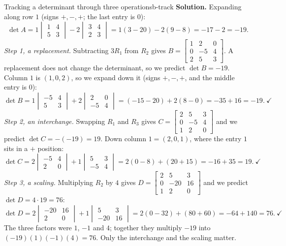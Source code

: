 \documentclass[11pt]{article}
\begin{document}
\begin{exmp}{Tracking a determinant through three operations}{b-track}
\textbf{Solution.} Expanding along row $1$ (signs $+,-,+$; the last entry is $0$):
\[
\det A=1\begin{vmatrix}1&4\\5&3\end{vmatrix}-2\begin{vmatrix}3&4\\2&3\end{vmatrix}=1(3-20)-2(9-8)=-17-2=-19.
\]
\emph{Step 1, a replacement.} Subtracting $3R_1$ from $R_2$ gives $B=\begin{bmatrix}1&2&0\\0&-5&4\\2&5&3\end{bmatrix}$. A replacement does not change the determinant, so we predict $\det B=-19$. Column $1$ is $(1,0,2)$, so we expand down it (signs $+,-,+$, and the middle entry is $0$):
\[
\det B=1\begin{vmatrix}-5&4\\5&3\end{vmatrix}+2\begin{vmatrix}2&0\\-5&4\end{vmatrix}=(-15-20)+2(8-0)=-35+16=-19.\ \checkmark
\]
\emph{Step 2, an interchange.} Swapping $R_1$ and $R_3$ gives $C=\begin{bmatrix}2&5&3\\0&-5&4\\1&2&0\end{bmatrix}$ and we predict $\det C=-(-19)=19$. Down column $1=(2,0,1)$, where the entry $1$ sits in a $+$ position:
\[
\det C=2\begin{vmatrix}-5&4\\2&0\end{vmatrix}+1\begin{vmatrix}5&3\\-5&4\end{vmatrix}=2(0-8)+(20+15)=-16+35=19.\ \checkmark
\]
\emph{Step 3, a scaling.} Multiplying $R_2$ by $4$ gives $D=\begin{bmatrix}2&5&3\\0&-20&16\\1&2&0\end{bmatrix}$ and we predict $\det D=4\cdot19=76$:
\[
\det D=2\begin{vmatrix}-20&16\\2&0\end{vmatrix}+1\begin{vmatrix}5&3\\-20&16\end{vmatrix}=2(0-32)+(80+60)=-64+140=76.\ \checkmark
\]
The three factors were $1$, $-1$ and $4$; together they multiply $-19$ into $(-19)(1)(-1)(4)=76$. Only the interchange and the scaling matter.
\end{exmp}
\end{document}
